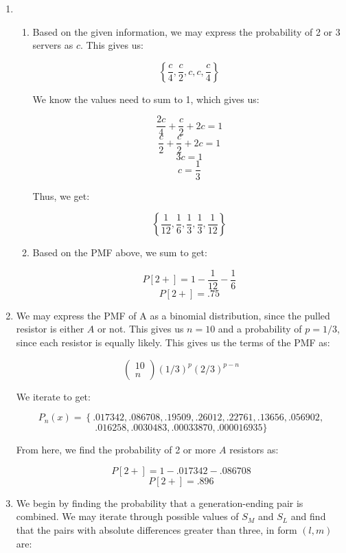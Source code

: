 \begin{enumerate}
\begin{enumerate}
    \end{enumerate}

  \item

    \begin{enumerate}
        
      \item Based on the given information, we may express the probability of 2 or 3 servers as $c$. This gives us:

        $$\left\{ \frac{c}{4},\frac{c}{2},c,c,\frac{c}{4} \right\}$$

        We know the values need to sum to 1, which gives us:

        $$\frac{2c}{4}+\frac{c}{2}+2c=1$$
        $$\frac{c}{2}+\frac{c}{2}+2c=1$$
        $$3c=1$$
        $$\boxed{c=\frac{1}{3}}$$

        Thus, we get:

        $$\left\{ \frac{1}{12},\frac{1}{6},\frac{1}{3},\frac{1}{3},\frac{1}{12} \right\}$$

      \item Based on the PMF above, we sum to get:

        $$P[2+]=1-\frac{1}{12}-\frac{1}{6}$$
        $$\boxed{P[2+]=.75}$$

    \end{enumerate}

  \item We may express the PMF of A as a binomial distribution, since the pulled resistor is either $A$ or not. This gives us $n=10$ and a probability of $p=1/3$, since each resistor is equally likely. This gives us the terms of the PMF as:

    $$\left( \begin{matrix} 10\\n\end{matrix} \right)(1/3)^{p}(2/3)^{p-n}$$

    We iterate to get:

    $$P_n(x)=\left\{.017342, .086708, .19509, .26012, .22761, .13656, .056902,$$$$.016258, .0030483, .00033870, .000016935 \}$$

    From here, we find the probability of 2 or more $A$ resistors as:

    $$P[2+]=1-.017342-.086708$$
    $$\boxed{P[2+]=.896}$$

  \item We begin by finding the probability that a generation-ending pair is combined. We may iterate through possible values of $S_M$ and $S_L$ and find that the pairs with absolute differences greater than three, in form $(l,m)$ are:


\end{enumerate}
